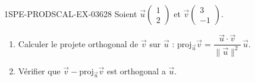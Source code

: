 \begin{exercice}{1SPE-PRODSCAL-EX-036}{2}{8}
Soient $\vec{u}\begin{pmatrix} 1 \\ 2 \end{pmatrix}$ et $\vec{v}\begin{pmatrix} 3 \\ -1 \end{pmatrix}$.
\begin{enumerate}
  \item Calculer le projete orthogonal de $\vec{v}$ sur $\vec{u}$ : $\text{proj}_{\vec{u}}\vec{v} = \dfrac{\vec{u} \cdot \vec{v}}{\|\vec{u}\|^2}\,\vec{u}$.
  \item Vérifier que $\vec{v} - \text{proj}_{\vec{u}}\vec{v}$ est orthogonal a $\vec{u}$.
\end{enumerate}
\end{exercice}
